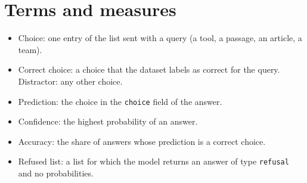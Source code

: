 \section{Terms and measures}
\label{app:terms}
\begin{itemize}
\item Choice: one entry of the list sent with a query (a tool, a passage, an article, a team).
\item Correct choice: a choice that the dataset labels as correct for the query. Distractor: any other choice.
\item Prediction: the choice in the \texttt{choice} field of the answer.
\item Confidence: the highest probability of an answer.
\item Accuracy: the share of answers whose prediction is a correct choice.
\item Refused list: a list for which the model returns an answer of type \texttt{refusal} and no probabilities.
\end{itemize}
